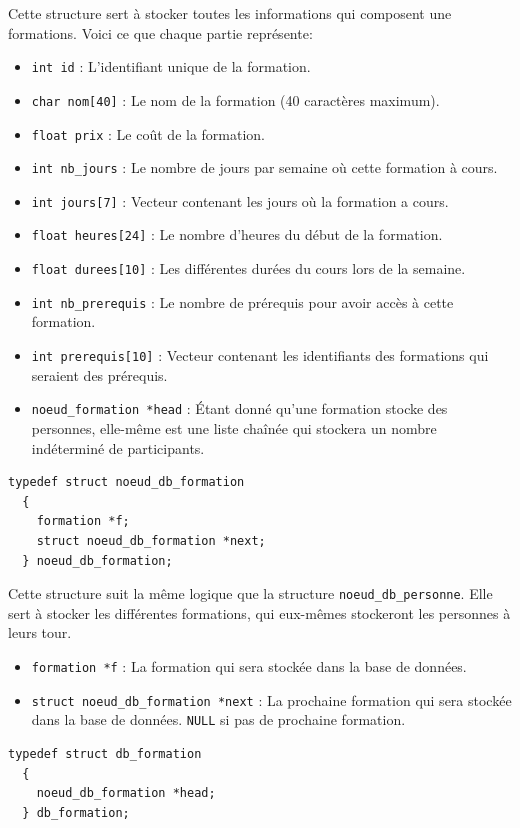 \documentclass[11pt]{article}
\begin{document}
Cette structure sert à stocker toutes les informations qui composent une formations.
Voici ce que chaque partie représente:
\begin{itemize}
\item \texttt{int id} : L'identifiant unique de la formation.
\item \texttt{char nom[40]} : Le nom de la formation (40 caractères maximum).
\item \texttt{float prix} : Le coût de la formation.
\item \texttt{int nb\_jours} : Le nombre de jours par semaine où cette formation à cours.
\item \texttt{int jours[7]} : Vecteur contenant les jours où la formation a cours.
\item \texttt{float heures[24]} : Le nombre d'heures du début de la formation.
\item \texttt{float durees[10]} : Les différentes durées du cours lors de la semaine.
\item \texttt{int nb\_prerequis} : Le nombre de prérequis pour avoir accès à cette formation.
\item \texttt{int prerequis[10]} : Vecteur contenant les identifiants des formations qui seraient des prérequis.
\item \texttt{noeud\_formation *head} : Étant donné qu'une formation stocke des personnes, elle-même est une liste chaînée qui stockera un nombre indéterminé de participants.
\end{itemize}

\begin{lstlisting}[firstnumber=115]
  typedef struct noeud_db_formation
  {
    formation *f;
    struct noeud_db_formation *next;
  } noeud_db_formation;
\end{lstlisting}

Cette structure suit la même logique que la structure \texttt{noeud\_db\_personne}. Elle sert à stocker les différentes formations, qui eux-mêmes stockeront les personnes à leurs tour.
\begin{itemize}
\item \texttt{formation *f} : La formation qui sera stockée dans la base de données.
\item \texttt{struct noeud\_db\_formation *next} : La prochaine formation qui sera stockée dans la base de données. \texttt{NULL} si pas de prochaine formation.
\end{itemize}

\begin{lstlisting}[firstnumber=127]
  typedef struct db_formation
  {
    noeud_db_formation *head;
  } db_formation;
\end{lstlisting}
\end{document}
